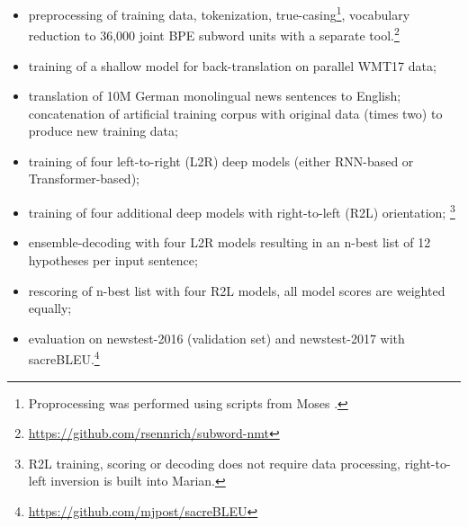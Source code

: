 \documentclass[11pt,a4paper]{article}
\begin{document}
\begin{itemize}
\item preprocessing of training data, tokenization, true-casing\footnote{Proprocessing was performed using scripts from Moses \cite{conf/acl/KoehnHBCFBCSMZDBCH07}.}, vocabulary reduction to 36,000 joint BPE subword units \cite{sennrich2016bpe} with a separate tool.\footnote{\url{https://github.com/rsennrich/subword-nmt}}
\item training of a shallow model for back-translation on parallel WMT17 data;
\item translation of 10M German monolingual news sentences to English; concatenation of artificial training corpus with original data (times two) to produce new training data;
\item training of four left-to-right (L2R) deep models (either RNN-based or Transformer-based);
\item training of four additional deep models with right-to-left (R2L) orientation; \footnote{R2L training, scoring or decoding does not require data processing, right-to-left inversion is built into Marian.}
\item ensemble-decoding with four L2R models resulting in an n-best list of 12 hypotheses per input sentence;
\item rescoring of n-best list with four R2L models, all model scores are weighted equally; 
\item evaluation on newstest-2016 (validation set) and newstest-2017 with sacreBLEU.\footnote{\url{https://github.com/mjpost/sacreBLEU}}
\end{itemize}
\end{document}
